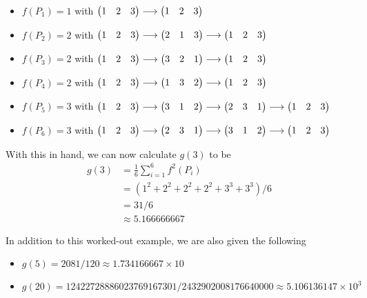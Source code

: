 \begin{itemize}
    \item \( f \left( P_1 \right) = 1 \) with \( \begin{pmatrix} 1 & 2 & 3 \end{pmatrix} \longrightarrow \begin{pmatrix} 1 & 2 & 3 \end{pmatrix} \)
    \item \( f \left( P_2 \right) = 2 \) with \( \begin{pmatrix} 1 & 2 & 3 \end{pmatrix} \longrightarrow \begin{pmatrix} 2 & 1 & 3 \end{pmatrix} \longrightarrow \begin{pmatrix} 1 & 2 & 3 \end{pmatrix} \)
    \item \( f \left( P_3 \right) = 2 \) with \( \begin{pmatrix} 1 & 2 & 3 \end{pmatrix} \longrightarrow \begin{pmatrix} 3 & 2 & 1 \end{pmatrix} \longrightarrow \begin{pmatrix} 1 & 2 & 3 \end{pmatrix} \)
    \item \( f \left( P_4 \right) = 2 \) with \( \begin{pmatrix} 1 & 2 & 3 \end{pmatrix} \longrightarrow \begin{pmatrix} 1 & 3 & 2 \end{pmatrix} \longrightarrow \begin{pmatrix} 1 & 2 & 3 \end{pmatrix} \)
    \item \( f \left( P_5 \right) = 3 \) with \( \begin{pmatrix} 1 & 2 & 3 \end{pmatrix} \longrightarrow \begin{pmatrix} 3 & 1 & 2 \end{pmatrix} \longrightarrow \begin{pmatrix} 2 & 3 & 1 \end{pmatrix} \longrightarrow \begin{pmatrix} 1 & 2 & 3 \end{pmatrix} \)
    \item \( f \left( P_6 \right) = 3 \) with \( \begin{pmatrix} 1 & 2 & 3 \end{pmatrix} \longrightarrow \begin{pmatrix} 2 & 3 & 1 \end{pmatrix} \longrightarrow \begin{pmatrix} 3 & 1 & 2 \end{pmatrix} \longrightarrow \begin{pmatrix} 1 & 2 & 3 \end{pmatrix} \)
\end{itemize}

With this in hand, we can now calculate \( g \left( 3 \right) \) to be
\begin{align*}
    g \left( 3 \right) &= \frac{1}{6} \sum_{i = 1}^{6} f^2 \left( P_i \right) \\
    &= \left( 1^2 + 2^2 + 2^2 + 2^2 + 3^3 + 3^3 \right) / 6 \\
    &= 31 / 6 \\
    &\approx 5.166666667
\end{align*}

In addition to this worked-out example, we are also given the following

\begin{itemize}
    \item \( g \left( 5 \right) = 2081/120 \approx 1.734166667 \times 10 \)
    \item \( g \left( 20 \right) = 12422728886023769167301/2432902008176640000 \approx 5.106136147 \times 10^3 \)
\end{itemize}
